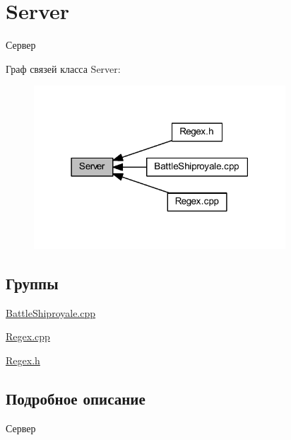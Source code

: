 \hypertarget{group__server}{}\section{Server}
\label{group__server}


Сервер  


Граф связей класса Server\+:
\nopagebreak
\begin{figure}[H]
\begin{center}
\leavevmode
\includegraphics[width=267pt]{group__server}
\end{center}
\end{figure}
\subsection*{Группы}
\begin{DoxyCompactItemize}
\item 
\mbox{\hyperlink{group__battleshiproyalecpp}{Battle\+Shiproyale.\+cpp}}
\item 
\mbox{\hyperlink{group__regexcpp}{Regex.\+cpp}}
\item 
\mbox{\hyperlink{group__regexh}{Regex.\+h}}
\end{DoxyCompactItemize}


\subsection{Подробное описание}
Сервер 

